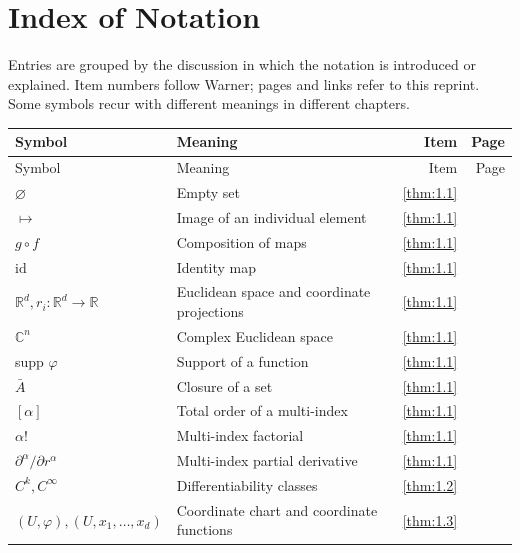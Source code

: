\chapter*{Index of Notation}
Entries are grouped by the discussion in which the notation is introduced
or explained. Item numbers follow Warner; pages and links refer to this reprint.
Some symbols recur with different meanings in different chapters.

{\small\setlength{\tabcolsep}{3pt}\renewcommand{\arraystretch}{1.15}
\begin{longtable}{@{}>{\raggedright\arraybackslash}p{.39\linewidth}>{\raggedright\arraybackslash}p{.39\linewidth}r r@{}}
\toprule Symbol & Meaning & Item & Page\\\midrule\endfirsthead
\toprule Symbol & Meaning & Item & Page\\\midrule\endhead
\bottomrule\endfoot
$\varnothing$ & Empty set & \ref{thm:1.1} & \pageref{thm:1.1} \\
$\mapsto$ & Image of an individual element & \ref{thm:1.1} & \pageref{thm:1.1} \\
$g\circ f$ & Composition of maps & \ref{thm:1.1} & \pageref{thm:1.1} \\
$\mathrm{id}$ & Identity map & \ref{thm:1.1} & \pageref{thm:1.1} \\
$\mathbb{R}^{d},\allowbreak  r_{i}:\mathbb{R}^{d}\to\mathbb{R}$ & Euclidean space and coordinate projections & \ref{thm:1.1} & \pageref{thm:1.1} \\
$\mathbb{C}^{n}$ & Complex Euclidean space & \ref{thm:1.1} & \pageref{thm:1.1} \\
supp $\varphi$ & Support of a function & \ref{thm:1.1} & \pageref{thm:1.1} \\
$\bar{A}$ & Closure of a set & \ref{thm:1.1} & \pageref{thm:1.1} \\
$[\alpha]$ & Total order of a multi-index & \ref{thm:1.1} & \pageref{thm:1.1} \\
$\alpha!$ & Multi-index factorial & \ref{thm:1.1} & \pageref{thm:1.1} \\
$\partial^\alpha/\partial r^\alpha$ & Multi-index partial derivative & \ref{thm:1.1} & \pageref{thm:1.1} \\
$C^{k},\allowbreak  C^{\infty}$ & Differentiability classes & \ref{thm:1.2} & \pageref{thm:1.2} \\
$(U,\allowbreak \varphi),\allowbreak  (U,\allowbreak x_{1},\allowbreak \ldots,\allowbreak x_{d})$ & Coordinate chart and coordinate functions & \ref{thm:1.3} & \pageref{thm:1.3} \\

\end{longtable}}
